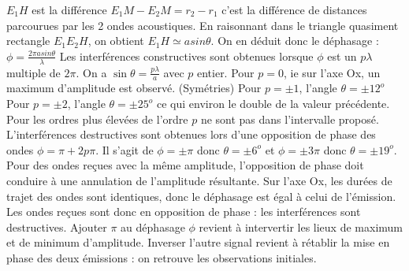 \begin{Answer}
  \Question
  \subQuestion
\subQuestion
$E_1H$ est la différence $E_1M - E_2M = r_2 - r_1$ c’est la différence de
distances parcourues par les 2 ondes acoustiques.
\subQuestion
En raisonnant dans le triangle quasiment rectangle $E_1 E_2 H$, on obtient
$E_1 H \simeq asin \theta$. On en déduit donc le déphasage : $\phi=\frac{2\pi asin\theta}{\lambda}$
\subQuestion
Les interférences constructives sont obtenues lorsque $\phi$ est un $p\lambda$
multiple de $2\pi$. On a $\sin \theta =\frac{p\lambda}{a}$ avec $p$ entier.
Pour $p = 0$, ie sur l’axe Ox, un maximum d’amplitude est observé.
(Symétries)
Pour $p = \pm 1$, l’angle $\theta = \pm12^o$
Pour $p = \pm 2$, l’angle $\theta = \pm 25^o$ ce qui environ le double de la valeur
précédente.
Pour les ordres plus élevées de l’ordre $p$ ne sont pas dans l’intervalle
proposé.
\Question
\subQuestion
L’interférences destructives sont obtenues lors d’une opposition de
phase des ondes $\phi = \pi + 2p\pi$. Il s’agit de $\phi = \pm \pi$ donc $\theta = \pm 6^o$ et
$\phi = \pm 3\pi$ donc $\theta = \pm 19^o$.
\subQuestion Pour des ondes reçues avec la même amplitude, l’opposition de phase
doit conduire à une annulation de l’amplitude résultante.
\Question
\subQuestion
Sur l’axe Ox, les durées de trajet des ondes sont identiques, donc le
déphasage est égal à celui de l’émission. Les ondes reçues sont donc en
opposition de phase : les interférences sont destructives.
\subQuestion Ajouter $\pi$ au déphasage $\phi$ revient à intervertir les lieux de maximum
et de minimum d’amplitude.
\subQuestion Inverser l’autre signal revient à rétablir la mise en phase des deux
émissions : on retrouve les observations initiales.

\end{Answer}
